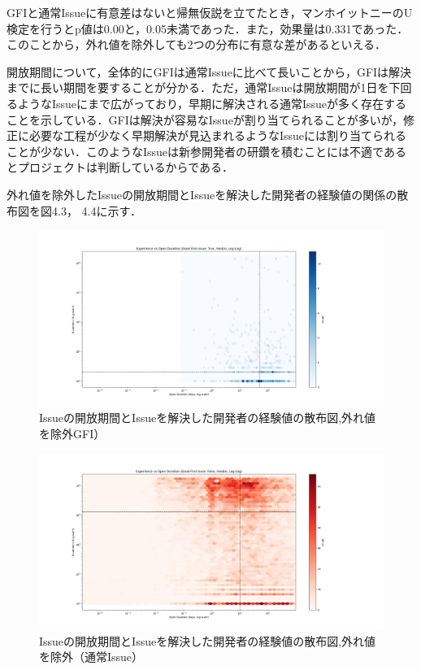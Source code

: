 \documentclass[11pt]{jreport}
\begin{document}
GFIと通常Issueに有意差はないと帰無仮説を立てたとき，マンホイットニーのU検定を行うとp値は0.00と，0.05未満であった．また，効果量は0.331であった．このことから，外れ値を除外しても2つの分布に有意な差があるといえる．

開放期間について，全体的にGFIは通常Issueに比べて長いことから，GFIは解決までに長い期間を要することが分かる．ただ，通常Issueは開放期間が1日を下回るようなIssueにまで広がっており，早期に解決される通常Issueが多く存在することを示している．GFIは解決が容易なIssueが割り当てられることが多いが，修正に必要な工程が少なく早期解決が見込まれるようなIssueには割り当てられることが少ない．このようなIssueは新参開発者の研鑽を積むことには不適であるとプロジェクトは判断しているからである．

外れ値を除外したIssueの開放期間とIssueを解決した開発者の経験値の関係の散布図を図4.3， 4.4に示す．

\begin{figure}[H]
\centerline{\includegraphics[width=0.9\linewidth]{@BSthesis2024_Nakai/BSthesis2024_Nakai_fig/hex_blue.png}}
\caption{Issueの開放期間とIssueを解決した開発者の経験値の散布図,外れ値を除外GFI）}
\label{fig:milestone}
\end{figure}

\begin{figure}[H]
\centerline{\includegraphics[width=0.9\linewidth]{@BSthesis2024_Nakai/BSthesis2024_Nakai_fig/hex_red.png}}
\caption{Issueの開放期間とIssueを解決した開発者の経験値の散布図,外れ値を除外（通常Issue）}
\label{fig:milestone}
\end{figure}
\end{document}

